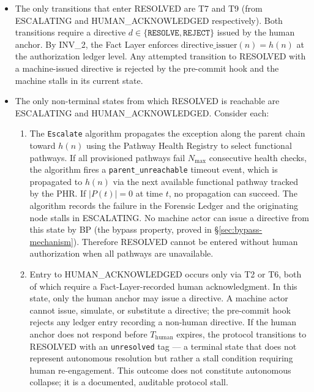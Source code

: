 \begin{itemize}
\item[\textbf{Step 1.}] The only transitions that enter RESOLVED are T7 and T9 (from ESCALATING and HUMAN\_ACKNOWLEDGED respectively). Both transitions require a directive $d \in \{\texttt{RESOLVE}, \texttt{REJECT}\}$ issued by the human anchor. By INV\_2, the Fact Layer enforces $\text{directive\_issuer}(n) = h(n)$ at the authorization ledger level. Any attempted transition to RESOLVED with a machine-issued directive is rejected by the pre-commit hook and the machine stalls in its current state.

\item[\textbf{Step 2.}] The only non-terminal states from which RESOLVED is reachable are ESCALATING and HUMAN\_ACKNOWLEDGED. Consider each:

\begin{enumerate}
\item[\textbf{ESCALATING}:] The \texttt{Escalate} algorithm propagates the exception along the parent chain toward $h(n)$ using the Pathway Health Registry to select functional pathways. If all provisioned pathways fail $N_{\max}$ consecutive health checks, the algorithm fires a \texttt{parent\_unreachable} timeout event, which is propagated to $h(n)$ via the next available functional pathway tracked by the PHR. If $|P(t)| = 0$ at time $t$, no propagation can succeed. The algorithm records the failure in the Forensic Ledger and the originating node stalls in ESCALATING. No machine actor can issue a directive from this state by BP (the bypass property, proved in \S\ref{sec:bypass-mechanism}). Therefore RESOLVED cannot be entered without human authorization when all pathways are unavailable.

\item[\textbf{HUMAN\_ACKNOWLEDGED}:] Entry to HUMAN\_ACKNOWLEDGED occurs only via T2 or T6, both of which require a Fact-Layer-recorded human acknowledgment. In this state, only the human anchor may issue a directive. A machine actor cannot issue, simulate, or substitute a directive; the pre-commit hook rejects any ledger entry recording a non-human directive. If the human anchor does not respond before $T_{\text{human}}$ expires, the protocol transitions to RESOLVED with an \texttt{unresolved} tag — a terminal state that does not represent autonomous resolution but rather a stall condition requiring human re-engagement. This outcome does not constitute autonomous collapse; it is a documented, auditable protocol stall.
\end{enumerate}


\end{itemize}
